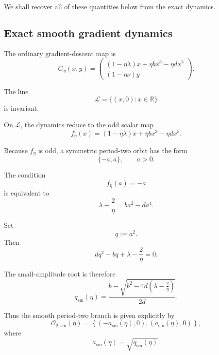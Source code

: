 We shall recover all of these quantities below from the exact
dynamics.

\subsection{Exact smooth gradient dynamics}
\label{subsec:planar-smooth-dynamics}

The ordinary gradient-descent map is
\begin{equation}
G_\eta(x,y)
=
\begin{pmatrix}
(1-\eta\lambda)x
+
\eta bx^3
-
\eta dx^5
\\[1mm]
(1-\eta\nu)y
\end{pmatrix}.
\label{eq:planar-GD-map}
\end{equation}

The line
\begin{equation}
\mathcal L
=
\{(x,0):x\in\mathbb R\}
\label{eq:invariant-axis}
\end{equation}
is invariant.

On $\mathcal L$, the dynamics reduce to the odd scalar map
\begin{equation}
f_\eta(x)
=
(1-\eta\lambda)x
+
\eta bx^3
-
\eta dx^5.
\label{eq:scalar-smooth-map}
\end{equation}

Because $f_\eta$ is odd, a symmetric period-two orbit has the form
\[
\{-a,a\},
\qquad
a>0.
\]

The condition
\[
f_\eta(a)=-a
\]
is equivalent to
\begin{equation}
\lambda-\frac{2}{\eta}
=
ba^2-da^4.
\label{eq:smooth-cycle-equation}
\end{equation}

Set
\begin{equation}
q:=a^2.
\label{eq:q-amplitude}
\end{equation}
Then
\begin{equation}
dq^2-bq
+
\lambda-\frac{2}{\eta}
=
0.
\label{eq:q-quadratic}
\end{equation}

The small-amplitude root is therefore
\begin{equation}
q_{\mathrm{sm}}(\eta)
=
\frac{
b-
\sqrt{
b^2
-
4d\left(\lambda-\frac{2}{\eta}\right)
}
}{
2d}.
\label{eq:q-smooth-exact}
\end{equation}

Thus the smooth period-two branch is given explicitly by
\begin{equation}
\boxed{
\mathcal O_{2,\mathrm{sm}}(\eta)
=
\left\{
(-a_{\mathrm{sm}}(\eta),0),
(a_{\mathrm{sm}}(\eta),0)
\right\},
}
\label{eq:smooth-cycle-exact}
\end{equation}
where
\begin{equation}
a_{\mathrm{sm}}(\eta)
=
\sqrt{q_{\mathrm{sm}}(\eta)}.
\label{eq:a-smooth}
\end{equation}

